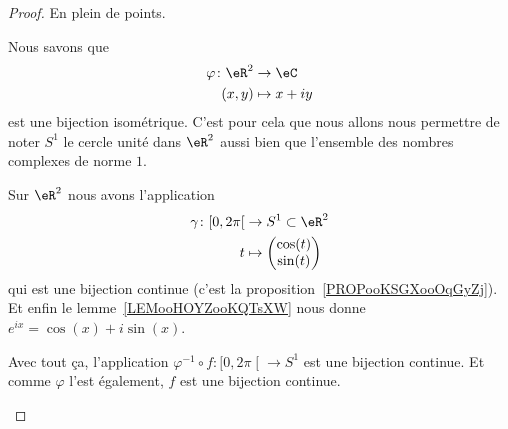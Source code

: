 \begin{proof}
	En plein de points.
	\begin{subproof}


		Nous savons que
		\begin{equation}
			\begin{aligned}
				\varphi\colon \eR^2 & \to \eC      \\
				(x,y)               & \mapsto x+iy
			\end{aligned}
		\end{equation}
		est une bijection isométrique. C'est pour cela que nous allons nous permettre de noter \( S^1\) le cercle unité dans \( \eR^2\) aussi bien que l'ensemble des nombres complexes de norme \( 1\).

		Sur \( \eR^2\) nous avons l'application
		\begin{equation}
			\begin{aligned}
				\gamma\colon \mathopen[ 0 , 2\pi \mathclose[ & \to S^1\subset \eR^2   \\
				t                                            & \mapsto \begin{pmatrix}
					                                                       \cos(t) \\
					                                                       \sin(t)
				                                                       \end{pmatrix}
			\end{aligned}
		\end{equation}
		qui est une bijection continue (c'est la proposition~\ref{PROPooKSGXooOqGyZj}). Et enfin le lemme~\ref{LEMooHOYZooKQTsXW} nous donne \(  e^{ix}=\cos(x)+i\sin(x)\).

		Avec tout ça, l'application \( \varphi^{-1}\circ f\colon \mathopen[ 0 , 2\pi \mathclose[\to S^1 \) est une bijection continue. Et comme \( \varphi\) l'est également, \( f\) est une bijection continue.


\end{subproof}
\end{proof}
